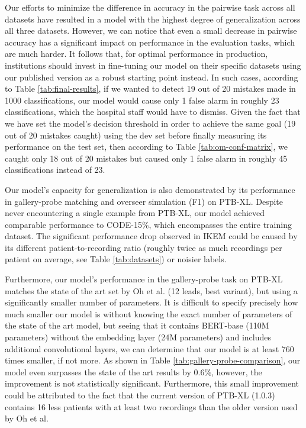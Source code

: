 \documentclass[preprint,12pt]{elsarticle}
\begin{document}
Our efforts to minimize the difference in accuracy in the pairwise task across all datasets have resulted in a model with the highest degree of generalization across all three datasets. However, we can notice that even a small decrease in pairwise accuracy has a significant impact on performance in the evaluation tasks, which are much harder. It follows that, for optimal performance in production, institutions should invest in fine-tuning our model on their specific datasets using our published version as a robust starting point instead. In such cases, according to Table \ref{tab:final-results}, if we wanted to detect 19 out of 20 mistakes made in 1000 classifications, our model would cause only 1 false alarm in roughly 23 classifications, which the hospital staff would have to dismiss.  Given the fact that we have set the model's decision threshold in order to achieve the same goal (19 out of 20 mistakes caught) using the dev set before finally measuring its performance on the test set, then according to Table \ref{tab:om-conf-matrix}, we caught only 18 out of 20 mistakes but caused only 1 false alarm in roughly 45 classifications instead of 23.

Our model's capacity for generalization is also demonstrated by its performance in gallery-probe matching and overseer simulation (F1) on PTB-XL. Despite never encountering a single example from PTB-XL, our model achieved comparable performance to CODE-15\%, which encompasses the entire training dataset. The significant performance drop observed in IKEM could be caused by its different patient-to-recording ratio (roughly twice as much recordings per patient on average, see Table \ref{tab:datasets}) or noisier labels.

Furthermore, our model's performance in the gallery-probe task on PTB-XL matches the state of the art set by Oh et al. \cite{oh2022lead} (12 leads, best variant), but using a significantly smaller number of parameters. It is difficult to specify precisely how much smaller our model is without knowing the exact number of parameters of the state of the art model, but seeing that it contains BERT-base (110M parameters) without the embedding layer (24M parameters) and includes additional convolutional layers, we can determine that our model is at least 760 times smaller, if not more.  As shown in Table \ref{tab:gallery-probe-comparison}, our model even surpasses the state of the art results by 0.6\%, however, the improvement is not statistically significant. Furthermore, this small improvement could be attributed to the fact that the current version of PTB-XL (1.0.3) contains 16 less patients with at least two recordings than the older version used by Oh et al.
\end{document}
